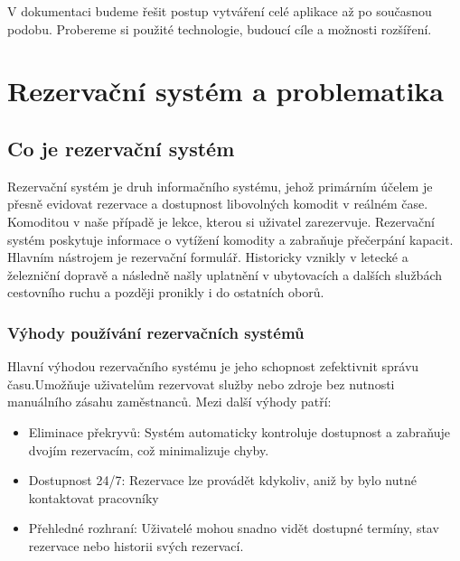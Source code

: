 \documentclass[12pt, a4paper,
openright
]{report}
\begin{document}
 V dokumentaci budeme řešit postup vytváření celé aplikace až po současnou podobu. Probereme si použité technologie, budoucí cíle a možnosti rozšíření.



\chapter{Rezervační systém a problematika}


\section{Co je rezervační systém}
Rezervační systém je druh informačního systému, jehož primárním účelem je přesně evidovat rezervace a dostupnost libovolných komodit v reálném čase. Komoditou v naše případě je lekce, kterou si uživatel zarezervuje. Rezervační systém poskytuje informace o vytížení komodity a zabraňuje přečerpání kapacit. Hlavním nástrojem je rezervační formulář. Historicky vznikly v letecké a železniční dopravě a následně našly uplatnění v ubytovacích a dalších službách cestovního ruchu a později pronikly i do ostatních oborů.

\subsection{Výhody používání rezervačních systémů}
Hlavní výhodou rezervačního systému je jeho schopnost zefektivnit správu času.Umožňuje uživatelům rezervovat služby nebo zdroje bez nutnosti manuálního zásahu zaměstnanců. Mezi další výhody patří:

\begin{itemize}
	\item Eliminace překryvů: Systém automaticky kontroluje dostupnost a zabraňuje dvojím rezervacím, což minimalizuje chyby.
        
	\item Dostupnost 24/7: Rezervace lze provádět kdykoliv, aniž by bylo nutné kontaktovat pracovníky
	\item Přehledné rozhraní: Uživatelé mohou snadno vidět dostupné termíny, stav rezervace nebo historii svých rezervací.
	
\end{itemize}
\clearpage
\end{document}
